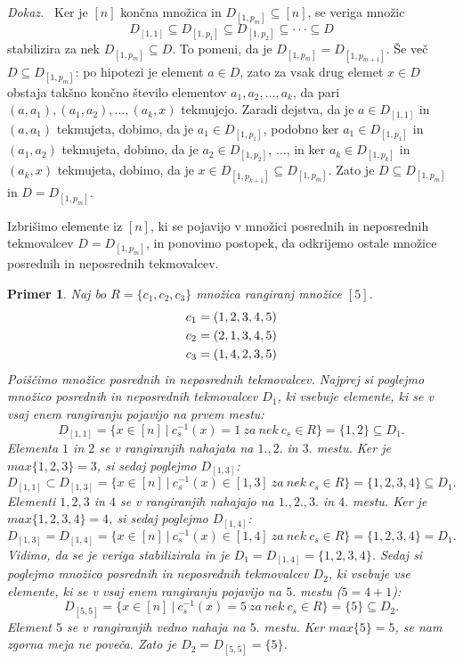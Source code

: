 \documentclass[a4paper, 12pt]{book}
\newtheorem{primer}{Primer}[chapter]
\newenvironment{dokaz}{\emph{Dokaz.}\ }{\hspace{\fill}{$\Box$}}
\begin{document}
\begin{dokaz}
    Ker je $[n]$ končna množica in $D_{[1, p_m]} \subseteq [n]$, se veriga množic 
    \[
        D_{[1, 1]} \subseteq D_{[1, p_1]} \subseteq D_{[1, p_2]} \subseteq \cdot\cdot\cdot \subseteq D
    \]
    stabilizira za nek $D_{[1, p_m]} \subseteq D$. To pomeni, da je $D_{[1, p_m]} = D_{[1, p_{m+1}]}$. Še več $D \subseteq D_{[1, p_m]}$: po hipotezi je element $a \in D$, zato za vsak drug elemet $x \in D$ obstaja takšno končno število elementov $a_1, a_2, \dots, a_k$, da pari $(a, a_1),(a_1, a_2), \dots, (a_k, x)$ tekmujejo. Zaradi dejstva, da je $a \in D_{[1, 1]}$ in $(a, a_1)$ tekmujeta, dobimo, da je $a_1 \in D_{[1, p_1]}$, podobno ker $a_1 \in D_{[1, p_1]}$ in $(a_1, a_2)$ tekmujeta, dobimo, da je $a_2 \in D_{[1, p_2]}$, $\dots$, in ker $a_{k} \in D_{[1, p_k]}$ in $(a_k, x)$ tekmujeta, dobimo, da je $x \in D_{[1, p_{k+1}]} \subseteq D_{[1, p_m]}$. Zato je $D \subseteq D_{[1, p_m]}$ in $D = D_{[1, p_m]}$.

    Izbrišimo elemente iz $[n]$, ki se pojavijo v množici posrednih in neposrednih tekmovalcev $D = D_{[1, p_m]}$, in ponovimo postopek, da odkrijemo ostale množice posrednih in neposrednih tekmovalcev.
\end{dokaz}

\begin{primer}
     Naj bo $R = \{ c_1, c_2, c_3\}$ množica rangiranj množice $[5]$.
    \begin{align}
        c_1 &= (1, 2, 3, 4, 5) \notag\\
        c_2 &= (2, 1, 3, 4, 5) \notag\\
        c_3 &= (1, 4, 2, 3, 5) \notag
    \end{align}
    Poiščimo množice posrednih in neposrednih tekmovalcev. Najprej si poglejmo množico posrednih in neposrednih tekmovalcev $D_1$, ki vsebuje elemente, ki se v vsaj enem rangiranju pojavijo na prvem mestu:
    \[
        D_{[1,1]} = \{ x \in [n] \ | \ c_s^{-1}(x) = 1 \ za \ nek \ c_s \in R \} = \{ 1, 2 \} \subseteq D_1.
    \]
    Elementa $1$ in $2$ se v rangiranjih nahajata na $1., 2.$ in $3.$ mestu. Ker je $max\{ 1, 2, 3\} = 3$, si sedaj poglejmo $D_{[1, 3]}$:
    \[
        D_{[1,1]} \subset D_{[1,3]} = \{ x \in [n] \ | \ c_s^{-1}(x) \in [1, 3] \ za \ nek \ c_s \in R \} = \{ 1, 2, 3, 4\} \subseteq D_1.
    \]
    Elementi $1, 2, 3$ in $4$ se v rangiranjih nahajajo na $1., 2., 3.$ in $4.$ mestu. Ker je $max\{ 1, 2, 3, 4\} = 4$, si sedaj poglejmo $D_{[1, 4]}$:
    \[
        D_{[1,3]} = D_{[1,4]} = \{ x \in [n] \ | \ c_s^{-1}(x) \in [1, 4] \ za \ nek \ c_s \in R \} = \{ 1, 2, 3, 4\} = D_1.
    \]
    Vidimo, da se je veriga stabilizirala in je $D_1 = D_{[1, 4]} = \{ 1, 2, 3, 4\}$. Sedaj si poglejmo množico posrednih in neposrednih tekmovalcev $D_2$, ki vsebuje vse elemente, ki se v vsaj enem rangiranju pojavijo na $5.$ mestu ($5 = 4 + 1$):
    \[
        D_{[5,5]} = \{ x \in [n] \ | \ c_s^{-1}(x) = 5 \ za \ nek \ c_s \in R \} = \{ 5 \} \subseteq D_2.
    \]
    Element $5$ se v rangiranjih vedno nahaja na $5.$ mestu. Ker $max\{ 5 \} = 5$, se nam zgorna meja ne poveča. Zato je $D_2 = D_{[5, 5]} = \{ 5 \}$.
\end{primer}
\end{document}
